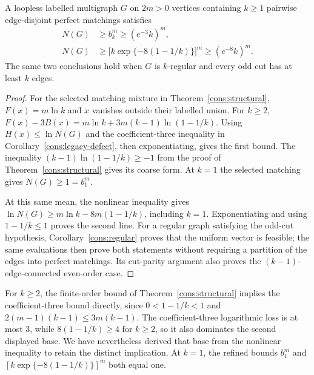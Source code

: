 \begin{corollary}\label{cons:legacy-counts}
A loopless labelled multigraph $G$ on $2m>0$ vertices containing $k\ge1$
pairwise edge-disjoint perfect matchings satisfies
\begin{align}
 N(G)&\ge b_k^m\ge(e^{-3}k)^m,\label{cons:legacy-three-count}\\
 N(G)&\ge\bigl[k\exp\{-8(1-1/k)\}\bigr]^m
                         \ge(e^{-8}k)^m.\label{cons:legacy-eight-count}
\end{align}
The same two conclusions hold when $G$ is $k$-regular and every odd cut
has at least $k$ edges.\label{cons:legacy-regular}
\end{corollary}
\begin{proof}
For the selected matching mixture in Theorem~\ref{cons:structural},
$F(x)=m\ln k$ and $x$ vanishes outside their labelled union.
For $k\ge2$, $F(x)-3B(x)=m\ln k+3m(k-1)\ln(1-1/k)$.
Using $H(x)\le\ln N(G)$ and the coefficient-three inequality in
Corollary~\ref{cons:legacy-defect}, then exponentiating, gives the first
bound. The inequality $(k-1)\ln(1-1/k)\ge-1$ from the proof of
Theorem~\ref{cons:structural} gives its coarse form. At $k=1$ the selected matching gives $N(G)\ge1=b_1^m$.

At this same mean, the nonlinear inequality gives
$\ln N(G)\ge m\ln k-8m(1-1/k)$, including $k=1$.
Exponentiating and using $1-1/k\le1$ proves the second line.
For a regular graph satisfying the odd-cut hypothesis,
Corollary~\ref{cons:regular} proves that the uniform vector is feasible;
the same evaluations then prove both statements without requiring
a partition of the edges into perfect matchings. Its cut-parity argument also proves the
$(k-1)$-edge-connected even-order case.
\end{proof}

For $k\ge2$, the finite-order bound of Theorem~\ref{cons:structural}
implies the coefficient-three bound directly, since $0<1-1/k<1$ and
$2(m-1)(k-1)\le3m(k-1)$. The coefficient-three logarithmic loss is at
most $3$, while $8(1-1/k)\ge4$ for $k\ge2$, so it also dominates the
second displayed base. We have nevertheless derived that base from
the nonlinear inequality to retain the distinct implication. At $k=1$,
the refined bounds $b_1^m$ and $[k\exp\{-8(1-1/k)\}]^m$ both equal one.

